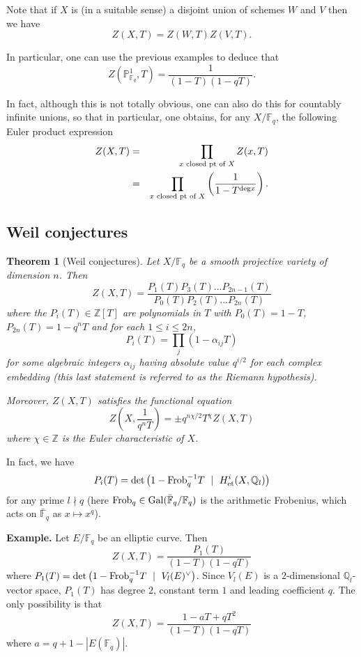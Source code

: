 \documentclass[12pt]{amsart}
\numberwithin{equation}{section}
\newtheorem{theorem}[equation]{Theorem}
\theoremstyle{remark}
\theoremstyle{definition}
\theoremstyle{definition}
\theoremstyle{definition}
\theoremstyle{definition}
\theoremstyle{definition}
\theoremstyle{definition}
\theoremstyle{definition}
\begin{document}
Note that if $X$ is  (in a suitable sense) a disjoint union of schemes $W$ and $V$ then we have
\[Z(X,T)=Z(W,T)Z(V,T).\]

In particular, one can use the previous examples to deduce that
\[Z(\mathbb{P}^1_{\mathbb{F}_q},T)=\frac{1}{(1-T)(1-qT)}.\]

In fact, although this is not totally obvious, one can also do this for countably infinite unions, so that in particular, one obtains, for any $X/\mathbb{F}_q$, the following Euler product expression
\begin{eqnarray*}
Z(X,T)&=&\prod_{x \textup{ closed pt of }X}Z(x,T)\\
&=& \prod_{x \textup{ closed pt of }X} \left(\frac{1}{1-T^{\textup{deg}x}}\right).
\end{eqnarray*} 

\subsection{Weil conjectures}

\begin{theorem}[Weil conjectures]
Let $X/\mathbb{F}_q$ be a smooth projective variety of dimension $n$. Then
\[Z(X,T)=\frac{P_1(T)P_3(T)...P_{2n-1}(T)}{P_0(T)P_2(T)...P_{2n}(T)}\]
where the $P_i(T)\in \mathbb{Z}[T]$ are polynomials in $T$ with $P_0(T)=1-T$, $P_{2n}(T)=1-q^nT$ and for each $1\leq i\leq 2n$, \[P_i(T)=\prod_{j}(1-\alpha_{ij}T)\]
for some algebraic integers $\alpha_{ij}$ having absolute value $q^{i/2}$ for each complex embedding (this last statement is referred to as the Riemann hypothesis). 

Moreover, $Z(X,T)$ satisfies the functional equation
\[Z\left(X,\frac{1}{q^nT}\right)=\pm q^{n\chi/2}T^\chi Z(X,T)\]
where $\chi \in \mathbb{Z}$ is the \emph{Euler characteristic} of $X$.
\end{theorem}

In fact, we have
\[P_i(T)=\textup{det}\left(1-\textup{Frob}^{-1}_qT ~\mid~ H^i_{\textup{et}}(X,\mathbb{Q}_l)\right)\]
for any prime $l\nmid q$ (here $\textup{Frob}_q\in \textup{Gal}(\bar{\mathbb{F}}_q/\mathbb{F}_q)$ is the arithmetic Frobenius, which acts on $\bar{\mathbb{F}}_q$ as $x\mapsto x^q$). 



\textbf{Example.} Let $E/\mathbb{F}_q$ be an elliptic curve. Then 
\[Z(X,T)=\frac{P_1(T)}{(1-T)(1-qT)}\]
where $P_1(T)=\textup{det}\left(1-\textup{Frob}^{-1}_qT ~\mid~ V_l(E)^\vee\right)$. Since $V_l(E)$ is a $2$-dimensional $\mathbb{Q}_l$-vector space, $P_1(T)$ has degree $2$, constant term $1$ and leading coefficient $q$. The only possibility is that
\[Z(X,T)=\frac{1-aT+qT^2}{(1-T)(1-qT)}\]
where $a=q+1-|E(\mathbb{F}_q)|$.  
\end{document}
